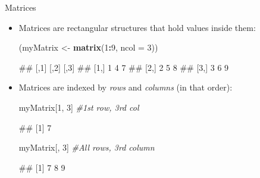 \documentclass[
  ignorenonframetext,
  aspectratio=169]{beamer}
\newenvironment{Shaded}{\begin{snugshade}}{\end{snugshade}}
\newcommand{\AttributeTok}[1]{\textcolor[rgb]{0.13,0.29,0.53}{#1}}
\newcommand{\CommentTok}[1]{\textcolor[rgb]{0.56,0.35,0.01}{\textit{#1}}}
\newcommand{\DecValTok}[1]{\textcolor[rgb]{0.00,0.00,0.81}{#1}}
\newcommand{\FunctionTok}[1]{\textcolor[rgb]{0.13,0.29,0.53}{\textbf{#1}}}
\newcommand{\NormalTok}[1]{#1}
\newcommand{\OtherTok}[1]{\textcolor[rgb]{0.56,0.35,0.01}{#1}}
\newcommand{\SpecialCharTok}[1]{\textcolor[rgb]{0.81,0.36,0.00}{\textbf{#1}}}
\let\oldShaded\Shaded %
\let\endoldShaded\endShaded
\renewenvironment{Shaded}{\footnotesize\oldShaded}{\endoldShaded}
\let\oldverbatim\verbatim %Change fontsize of code chunk output
\let\endoldverbatim\endverbatim
\renewenvironment{verbatim}{\footnotesize\oldverbatim}{\endoldverbatim}
\begin{document}
\begin{frame}[fragile]{Matrices}
\protect\hypertarget{matrices}{}
\begin{itemize}[<+->]
\item
  Matrices are rectangular structures that hold values inside them:

\begin{Shaded}
\begin{Highlighting}[]
\NormalTok{(myMatrix }\OtherTok{\textless{}{-}} \FunctionTok{matrix}\NormalTok{(}\DecValTok{1}\SpecialCharTok{:}\DecValTok{9}\NormalTok{, }\AttributeTok{ncol =} \DecValTok{3}\NormalTok{))}
\end{Highlighting}
\end{Shaded}

\begin{verbatim}
##      [,1] [,2] [,3]
## [1,]    1    4    7
## [2,]    2    5    8
## [3,]    3    6    9
\end{verbatim}
\item
  Matrices are indexed by \emph{rows} and \emph{columns} (in that
  order):

\begin{Shaded}
\begin{Highlighting}[]
\NormalTok{myMatrix[}\DecValTok{1}\NormalTok{, }\DecValTok{3}\NormalTok{]  }\CommentTok{\#1st row, 3rd col}
\end{Highlighting}
\end{Shaded}

\begin{verbatim}
## [1] 7
\end{verbatim}

\begin{Shaded}
\begin{Highlighting}[]
\NormalTok{myMatrix[, }\DecValTok{3}\NormalTok{]  }\CommentTok{\#All rows, 3rd column}
\end{Highlighting}
\end{Shaded}

\begin{verbatim}
## [1] 7 8 9
\end{verbatim}
\end{itemize}
\end{frame}
\end{document}
